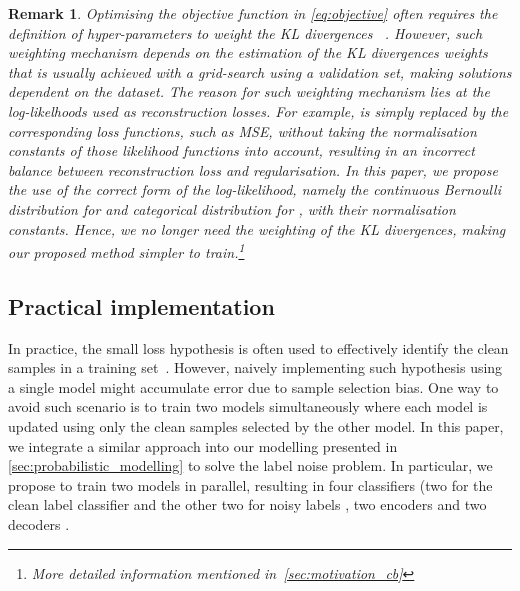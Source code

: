 \documentclass[10pt,twocolumn,letterpaper]{article}
\newtheorem{remark}{Remark}
\begin{document}
        \begin{remark}
            Optimising the objective function in \eqref{eq:objective} often requires the definition of  hyper-parameters to weight the KL divergences ~\cite{graves2011practical}. However, such weighting mechanism depends on the estimation of the KL divergences weights that is usually achieved with a grid-search using a validation set, making solutions dependent on the dataset. 
            The reason for such weighting mechanism lies at the log-likelhoods used as reconstruction losses. For example,  is simply replaced by the corresponding loss functions, such as MSE, without taking the normalisation constants of those likelihood functions into account, resulting in an incorrect balance between reconstruction loss and regularisation. In this paper, we propose the use of the correct form of the log-likelihood, namely the continuous Bernoulli distribution for  and categorical distribution for , with their normalisation constants. Hence, we no longer need the weighting of the KL divergences, making our proposed method simpler to train.\footnote{More detailed information mentioned in~\cref{sec:motivation_cb}}
            \label{remark:avoid_reweighting}
        \end{remark}
    
    \subsection{Practical implementation}
    \label{sec:practical_implementation}

    In practice, the small loss hypothesis is often used to effectively identify the clean samples in a training set~\cite{han2018co, li2020dividemix}. However, naively implementing such hypothesis using a single model might accumulate error due to sample selection bias. One way to avoid such scenario is to train two models simultaneously where each model is updated using only the clean samples selected by the other model. In this paper, we integrate a similar approach into our modelling presented in \cref{sec:probabilistic_modelling} to solve the label noise problem. 
    In particular, we propose to train two models in parallel, resulting in four classifiers (two for the clean label classifier  and the other two for noisy labels , two encoders  and two decoders .
\end{document}
